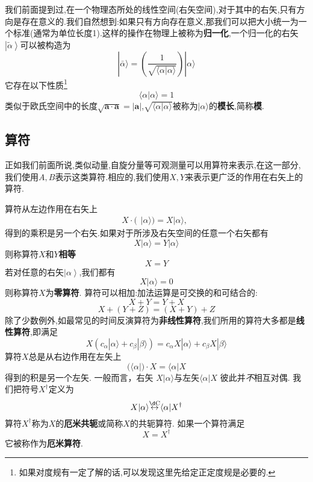 \documentclass[lang=cn,newtx,10pt,scheme=chinese,thmcnt=section]{elegantbook}
\begin{document}
我们前面提到过,在一个物理态所处的线性空间(右矢空间),对于其中的右矢,只有方向是存在意义的.我们自然想到:如果只有方向存在意义,那我们可以把大小统一为一个标准(通常为单位长度1).这样的操作在物理上被称为\textbf{归一化},一个归一化的右矢$\left|\tilde{\alpha}\right\rangle $可以被构造为
\begin{equation}
	|\bar{\alpha}\rangle=\left(\frac1{\sqrt{\langle\alpha|\alpha\rangle}}\right)|\alpha\rangle
\end{equation}
它存在以下性质\footnote{如果对度规有一定了解的话,可以发现这里先给定正定度规是必要的.}
\begin{equation}
	\langle\alpha|\alpha\rangle=1
\end{equation}
类似于欧氏空间中的长度$\sqrt{\mathbf{a}\cdot\mathbf{a}}=|\mathbf{a}|$,$\sqrt{\langle\alpha|\alpha\rangle}$被称为$|\alpha\rangle$的\textbf{模长},简称\textbf{模}.

\subsection*{算符}
正如我们前面所说,类似动量,自旋分量等可观测量可以用算符来表示,在这一部分,我们使用$A,B$表示这类算符.相应的,我们使用$X,Y$来表示更广泛的作用在右矢上的算符.

算符从左边作用在右矢上
$$X\cdot(\begin{array}{c}|\alpha\rangle)=X|\alpha\rangle,\end{array}$$
得到的乘积是另一个右矢.如果对于所涉及右矢空间的任意一个右矢都有
$$X|\alpha\rangle=Y|\alpha\rangle$$
则称算符$X$和$Y$\textbf{相等}
$$X=Y$$
若对任意的右矢$\left|\alpha\right\rangle$,我们都有
$$X|\alpha\rangle=0$$
则称算符$X$为\textbf{零算符}. 算符可以相加:加法运算是可交换的和可结合的:
$$X+Y=Y+X$$
$$X+(Y+Z)=(X+Y)+Z$$
除了少数例外,如最常见的时间反演算符为\textbf{非线性算符},我们所用的算符大多都是\textbf{线性算符},即满足
\begin{equation}
	X(c_\alpha|\alpha\rangle+c_\beta|\beta\rangle)=c_\alpha X|\alpha\rangle+c_\beta X|\beta\rangle 
\end{equation}
算符$X$总是从右边作用在左矢上
\begin{equation}
	(\langle\alpha|)\cdot X=\langle\alpha|X
\end{equation}
得到的积是另一个左矢. 一般而言，右矢 $X|\alpha\rangle$与左矢$\langle\alpha|X$ 彼此并\textit{不}相互对偶. 我们把符号$X^\dagger$定义为
\begin{equation}
	X|\alpha\rangle\overset{\mathrm{\d C}}{\operatorname*{\leftrightarrow}}\langle\alpha| X^\dagger
\end{equation}
算符$X^\dagger$称为$X$的\textbf{厄米共轭}或简称$X$的共轭算符. 如果一个算符满足
\begin{equation}
	X=X^\dagger
\end{equation}
它被称作为\textbf{厄米算符}.
\end{document}
